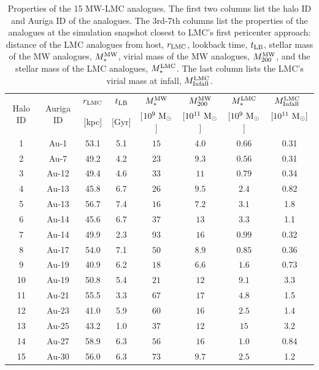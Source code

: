 \begin{table}
\centering
\begin{tabular}{|c|c|c|c|c|c|c|c|}
\hline
\multirow{2}{*}{Halo ID} & \multirow{2}{*}{Auriga ID} & $r_{\rm LMC}$ & $t_{\rm LB}$ & $M_\ast^{\rm MW}$ & $M_{200}^{\rm MW}$ & {$M_\ast^{\rm LMC}$} & $M^{\rm LMC}_{\rm Infall}$  \, \\
 &  & [kpc] & [Gyr]  & [$10^{9}~{\rm M}_\odot$] & [$10^{11}~{\rm M}_\odot$] & [$10^9~{\rm M}_\odot$] & $[10^{11}~{\rm M}_\odot]$\ \\ 
 \hline
       1 & Au-1 & 53.1 & 5.1 & $15$ & $4.0$ & $0.66$ & 0.31 \\
       2 & Au-7 & 49.2 & 4.2 & $23$ & $9.3$ & $0.56$ & 0.31\\
       3 & Au-12 & 49.4 & 4.6 & $33$ & $11$ & $0.79$ & 0.34 \\
       4 & Au-13 & 45.8 & 6.7 & $26$ & $9.5$ & $2.4$ & 0.82 \\
       5  & Au-13 & 56.7 & 7.4 & $16$ & $7.2$ & $3.1$ & 1.8\\
       6 & Au-14 & 45.6 & 6.7  & $37$ & $13$ & $3.3$ & 1.1\\
       7 & Au-14 & 49.9 & 2.3 & $93$ & $16$ & $0.99$ & 0.32\\
       8 & Au-17 & 54.0 & 7.1 & $50$ & $8.9$ & $0.85$ & 0.36\\
       9 & Au-19 & 40.9 & 6.2 & $18$ & $6.6$ & $1.6$ & 0.73\\
       10 & Au-19 & 50.8 & 5.4 & $21$ & $12$ & $9.1$ & 3.3\\
       11 & Au-21 & 55.5 & 3.3 & $67$ & $17$ & $4.8$ & 1.5\\
       12 & Au-23 & 41.0 & 5.9 & $60$ & $16$ & $2.5$ & 1.4\\
       13 & Au-25 & 43.2 & 1.0 & $37$ & $12$ & $15$ & 3.2\\
       14 & Au-27 & 58.9 & 6.3 & $56$ & $16$ & $1.0$ & 0.84\\
       15 & Au-30 & 56.0 & 6.3 & $73$ & $9.7$ & $2.5$ & 1.2\\
\hline
\end{tabular}
\caption{\label{tab:peri}Properties of the 15 MW-LMC analogues. The first two columns list the halo ID and Auriga ID of the analogues. The 3rd-7th columns list the properties of the analogues at the simulation snapshot closest to LMC's first pericenter approach: distance of the LMC analogues from host, $r_{\rm LMC}$, lookback time, $t_{\rm LB}$, stellar mass of the MW  analogues, $M_{\ast}^{\rm MW}$, virial mass of the MW analogues, $M_{200}^{\rm MW}$, and the stellar mass of the LMC analogues, $M_{\ast}^{\rm LMC}$. The last column lists the LMC's virial mass at infall, $M^{\rm LMC}_{\rm Infall}$.}
\end{table}


